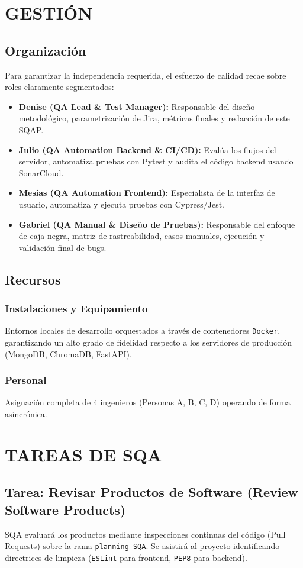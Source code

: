 \documentclass[12pt,a4paper]{article}
\begin{document}
\section{GESTIÓN}
\subsection{Organización}
Para garantizar la independencia requerida, el esfuerzo de calidad recae sobre roles claramente segmentados:
\begin{itemize}
    \item \textbf{Denise (QA Lead \& Test Manager):} Responsable del diseño metodológico, parametrización de Jira, métricas finales y redacción de este SQAP.
    \item \textbf{Julio (QA Automation Backend \& CI/CD):} Evalúa los flujos del servidor, automatiza pruebas con Pytest y audita el código backend usando SonarCloud.
    \item \textbf{Mesias (QA Automation Frontend):} Especialista de la interfaz de usuario, automatiza y ejecuta pruebas con Cypress/Jest.
    \item \textbf{Gabriel (QA Manual \& Diseño de Pruebas):} Responsable del enfoque de caja negra, matriz de rastreabilidad, casos manuales, ejecución y validación final de bugs.
\end{itemize}

\subsection{Recursos}
\subsubsection{Instalaciones y Equipamiento}
Entornos locales de desarrollo orquestados a través de contenedores \texttt{Docker}, garantizando un alto grado de fidelidad respecto a los servidores de producción (MongoDB, ChromaDB, FastAPI).
\subsubsection{Personal}
Asignación completa de 4 ingenieros (Personas A, B, C, D) operando de forma asincrónica.

\section{TAREAS DE SQA}
\subsection{Tarea: Revisar Productos de Software (Review Software Products)}
SQA evaluará los productos mediante inspecciones continuas del código (Pull Requests) sobre la rama \texttt{planning-SQA}. Se asistirá al proyecto identificando directrices de limpieza (\texttt{ESLint} para frontend, \texttt{PEP8} para backend).
\end{document}
